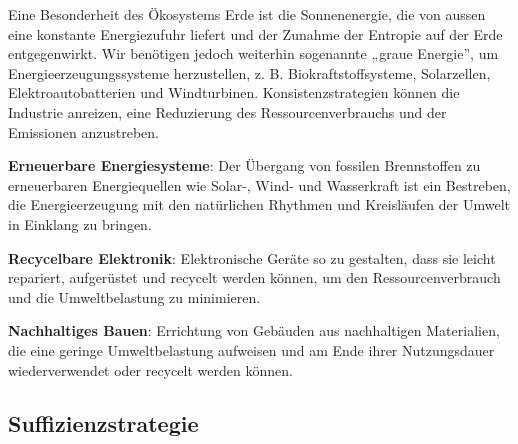 \documentclass[
  nswissgerman,
  a4paper,
  DIV=11,
  numbers=noendperiod,
  oneside,
  openany]{scrreprt}
\begin{document}
Eine Besonderheit des Ökosystems Erde ist die Sonnenenergie, die von
aussen eine konstante Energiezufuhr liefert und der Zunahme der Entropie
auf der Erde entgegenwirkt. Wir benötigen jedoch weiterhin sogenannte
„graue Energie'', um Energieerzeugungssysteme herzustellen, z. B.
Biokraftstoffsysteme, Solarzellen, Elektroautobatterien und
Windturbinen. Konsistenzstrategien können die Industrie anreizen, eine
Reduzierung des Ressourcenverbrauchs und der Emissionen anzustreben.

\begin{tcolorbox}[enhanced jigsaw, arc=.35mm, bottomrule=.15mm, bottomtitle=1mm, breakable, colback=white, colbacktitle=quarto-callout-tip-color!10!white, colframe=quarto-callout-tip-color-frame, coltitle=black, left=2mm, leftrule=.75mm, opacityback=0, opacitybacktitle=0.6, rightrule=.15mm, title={Konsistenzstrategien in der Praxis: Beispiele}, titlerule=0mm, toprule=.15mm, toptitle=1mm]

\textbf{Erneuerbare Energiesysteme}: Der Übergang von fossilen
Brennstoffen zu erneuerbaren Energiequellen wie Solar-, Wind- und
Wasserkraft ist ein Bestreben, die Energieerzeugung mit den natürlichen
Rhythmen und Kreisläufen der Umwelt in Einklang zu bringen.

\textbf{Recycelbare Elektronik}: Elektronische Geräte so zu gestalten,
dass sie leicht repariert, aufgerüstet und recycelt werden können, um
den Ressourcenverbrauch und die Umweltbelastung zu minimieren.

\textbf{Nachhaltiges Bauen}: Errichtung von Gebäuden aus nachhaltigen
Materialien, die eine geringe Umweltbelastung aufweisen und am Ende
ihrer Nutzungsdauer wiederverwendet oder recycelt werden können.

\end{tcolorbox}

\subsection{Suffizienzstrategie}\label{suffizienzstrategie}
\end{document}
